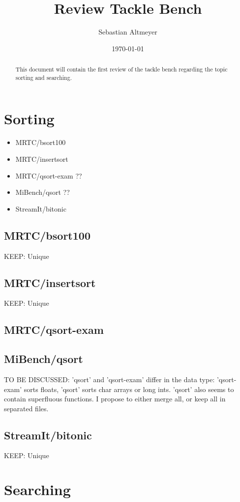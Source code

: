\documentclass[a4paper]{article}
\title{Review Tackle Bench}
\author{Sebastian Altmeyer}
\date{\today}
\begin{document}
\maketitle

\begin{abstract}
This document will contain the first review of the tackle bench regarding the topic sorting and searching.
\end{abstract}

\section{Sorting}

\begin{itemize}
	\item  MRTC/bsort100
	\item  MRTC/insertsort
	\item  MRTC/qsort-exam ??
	\item  MiBench/qsort ??
	\item  StreamIt/bitonic
\end{itemize}

\subsection{MRTC/bsort100}
	KEEP: Unique
\subsection{MRTC/insertsort}
	KEEP: Unique
\subsection{MRTC/qsort-exam}
\subsection{MiBench/qsort}
	TO BE DISCUSSED: 'qsort' and 'qsort-exam' differ in the data type: 'qsort-exam' sorts floats, 'qsort' sorts char arrays or long ints. 'qsort' also seems to contain superfluous functions. I propose to either merge all, or keep all in separated files.
\subsection{StreamIt/bitonic}
	KEEP: Unique


\section{Searching}
\end{document}
